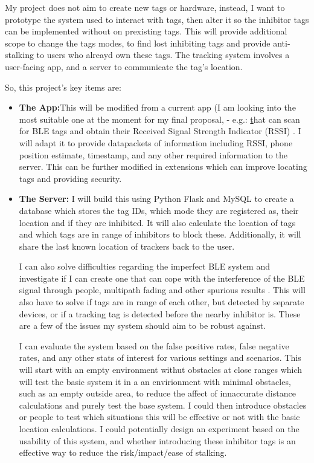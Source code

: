 \documentclass{article}
\begin{document}
My project does not aim to create new tags or hardware, instead, I want to prototype the system used to interact with tags, then alter it so the inhibitor tags can be implemented without on prexisting tags. This will provide additional scope to change the tags modes, to find lost inhibiting tags and provide anti-stalking to users who alreayd own these tags.
The tracking system involves a user-facing app, and a server to communicate the tag's location.

So, this project's key items are:
\begin{itemize}
\item{ {\bf The App:}This will be modified from a current app (I am looking into the most suitable one at the moment for my final proposal, - e.g.: \href{https://github.com/neXenio/BLE-Indoor-Positioning {this}} that can scan for BLE tags and obtain their Received Signal Strength Indicator (RSSI) . I will adapt it to provide datapackets of information including RSSI, phone position estimate, timestamp, and any other required information to the server. This can be further modified in extensions which can improve locating tags and providing security.}

\item{{\bf The Server:} I will build this using Python Flask and MySQL to create a database which stores the tag IDs, which mode they are registered as, their location and if they are inhibited. It will also calculate the location of tags and which tags are in range of inhibitors to block these. Additionally, it will share the last known location of trackers back to the user.}

I can also solve difficulties regarding the imperfect BLE system and investigate if I can create one that can cope with the interference of the BLE signal through people, multipath fading and other spurious results \cite{AccuracyBLE}. This will also have to solve if tags are in range of each other, but detected by separate devices, or if a tracking tag is detected before the nearby inhibitor is. These are a few of the issues my system should aim to be robust against.

I can evaluate the system based on the false positive rates, false negative rates, and any other stats of interest for various settings and scenarios. This will start with an empty environment withut obstacles at  close ranges which will test the basic system it in a an envirionment with minimal obstacles, such as an empty outside area, to reduce the affect of innaccurate distance calculations and purely test the base system. I could then introduce obstacles or people to test which situations this will be effective or not with the basic location calculations. I could potentially design an experiment based on the usability of this system, and whether introducing these inhibitor tags is an effective way to reduce the risk/impact/ease of stalking.


\end{itemize}
\end{document}
